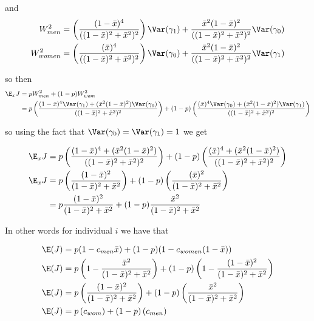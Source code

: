 and 
\begin{align*}
	W_{men}^2 &= \left(\frac{(1-\bar{x})^4}{((1-\bar{x})^2 + \bar{x}^2)^2}\right) \Var(\gamma_1) +  \frac{\bar{x}^2 (1-\bar{x})^2}{((1-\bar{x})^2 + \bar{x}^2)^2} \Var(\gamma_0) \\
	W_{women}^2 &= \left(\frac{(\bar{x})^4}{((1-\bar{x})^2 + \bar{x}^2)^2}\right) \Var(\gamma_0) + \frac{\bar{x}^2 (1-\bar{x})^2}{((1-\bar{x})^2 + \bar{x}^2)^2} \Var(\gamma_1) \\
\end{align*} 


so then
\begin{align*}
	\E_x J &= p W_{men}^2 + (1 - p)W_{wom}^2 \\
	&= p \left(\frac{(1-\bar{x})^4\Var(\gamma_1) + ( \bar{x}^2 (1-\bar{x})^2 ) \Var(\gamma_0)}{((1-\bar{x})^2 + \bar{x}^2)^2}\right) + (1-p)\left(\frac{(\bar{x})^4 \Var(\gamma_0) + ( \bar{x}^2 (1-\bar{x})^2 ) \Var(\gamma_1) }{((1-\bar{x})^2 + \bar{x}^2)^2}\right) \\
\end{align*} 

so using the fact that $\Var(\gamma_0) = \Var(\gamma_1) = 1$ we get

\begin{align*}
	\E_x J &= p \left(\frac{(1-\bar{x})^4 + ( \bar{x}^2 (1-\bar{x})^2 ) }{((1-\bar{x})^2 + \bar{x}^2)^2}\right) + (1-p)\left(\frac{(\bar{x})^4  + ( \bar{x}^2 (1-\bar{x})^2 ) }{((1-\bar{x})^2 + \bar{x}^2)^2}\right) \\
	\E_x J &= p \left(\frac{(1-\bar{x})^2 }{(1-\bar{x})^2 + \bar{x}^2}\right) + (1-p)\left(\frac{(\bar{x})^2 }{(1-\bar{x})^2 + \bar{x}^2}\right) \\
			 &= p \frac{(1-\bar{x})^2}{(1-\bar{x})^2 + \bar{x}^2} + (1-p) \frac{\bar{x}^2}{(1-\bar{x})^2 + \bar{x}^2}
\end{align*} 

In other words for individual $i$ we have that

\begin{align*}
	\E(J) &= p (1 - c_{men} \bar{x}) + (1-p) (1 - c_{women} (1 - \bar{x})) \\
	\E(J) &= p \left(1 - \frac{\bar{x}^2}{(1-\bar{x})^2 + \bar{x}^2}\right) + (1-p) \left(1 - \frac{(1-\bar{x})^2}{(1-\bar{x})^2 + \bar{x}^2} \right) \\
	\E(J) &= p \left(\frac{(1 - \bar{x})^2}{(1-\bar{x})^2 + \bar{x}^2}\right) + (1-p) \left(\frac{\bar{x}^2}{(1-\bar{x})^2 + \bar{x}^2} \right) \\
	\E(J) &= p \left(c_{wom} \right) + (1-p) \left( c_{men} \right) \\
\end{align*} 


